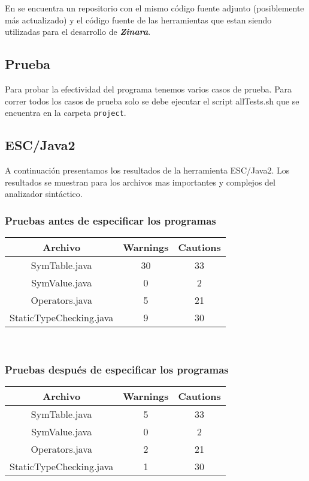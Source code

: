 \documentclass[12pt, spanish]{report}
\begin{document}
En \cite{github} se encuentra un repositorio con el mismo c\'odigo
fuente adjunto (posiblemente m\'as actualizado) y el c\'odigo fuente de
las herramientas que estan siendo utilizadas para el desarrollo de
\emph{\textbf{Zinara}}.

\subsection{Prueba}
\label{sec:pruebas}
Para probar la efectividad del programa tenemos varios casos de
prueba. Para correr todos los casos de prueba solo se debe ejecutar el
script allTests.sh que se encuentra en la carpeta \texttt{project}.

\subsection{ESC/Java2}
\label{sec:escjava}
A continuaci\'on presentamos los resultados de la herramienta
ESC/Java2. Los resultados se muestran para los archivos mas importantes
y complejos del analizador sint\'actico.\\

\subsubsection{Pruebas antes de especificar los programas}
\begin{tabular}{|c||cc|}
\hline
Archivo                 & Warnings & Cautions  \\
\hline \hline
SymTable.java           & 30  & 33 \\
SymValue.java           & 0   & 2  \\
Operators.java          & 5   & 21 \\
StaticTypeChecking.java & 9   & 30 \\
	\hline
\end{tabular}\\

\subsubsection{Pruebas despu\'es de especificar los programas}
\begin{tabular}{|c||cc|}
\hline
Archivo                 & Warnings & Cautions  \\
\hline \hline
SymTable.java           & 5   & 33 \\
SymValue.java           & 0   & 2  \\
Operators.java          & 2   & 21 \\
StaticTypeChecking.java & 1   & 30 \\
	\hline
\end{tabular}\\
\end{document}
